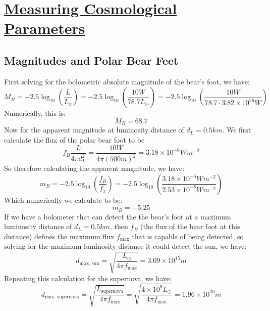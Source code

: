 \section[Measuring Cosmological Parameters]{\hyperlink{toc}{Measuring Cosmological Parameters}}

\subsection{Magnitudes and Polar Bear Feet}
First solving for the bolometric absolute magnitude of the bear's foot, we have:
\begin{equation}
    M_B = -2.5\log_{10}\left(\frac{L}{L_x}\right) = -2.5\log_{10}\left(\frac{10 \si{W}}{78.7 L_{\odot}}\right) = -2.5\log_{10}\left(\frac{10 \si{W}}{78.7 \cdot 3.82 \times 10^{26} \si{W}}\right) 
\end{equation}
Numerically, this is:
\begin{equation}
    \boxed{M_B = 68.7}
\end{equation}
Now for the apparent magnitude at luminosity distance of $d_L = 0.5\si{km}$. We first calculate the flux of the polar bear foot to be
\begin{equation}
    f_B \frac{L}{4\pi d_L^2} = \frac{10\si{W}}{4 \pi(500\si{m})^2} = 3.18 \times 10^{-6} \si{W m^{-2}}
\end{equation}
So therefore calculating the apparent magnitude, we have:
\begin{equation}
    m_B = -2.5\log_{10}\left(\frac{f_B}{f_x}\right) = -2.5\log_{10}\left(\frac{3.18 \times 10^{-6} \si{W m^{-2}}}{2.53 \times 10^{-8} \si{Wm^{-2}} }\right)
\end{equation}
Which numerically we calculate to be:
\begin{equation}
    \boxed{m_B = -5.25}
\end{equation}
If we have a bolometer that can detect the the bear's foot at a maximum luminosity distance of $d_L = 0.5\si{km}$, then $f_B$ (the flux of the bear foot at this distance) defines the maximum flux $f_{\text{max}}$ that is capable of being detected, so solving for the maximum luminosity distance it could detect the sun, we have:
\begin{equation}
    \boxed{d_{\text{max, sun}} = \sqrt{\frac{L_\odot}{4\pi f_{\text{max}}}} = 3.09 \times 10^{15}\si{m}}
\end{equation}
Repeating this calculation for the supernova, we have:
\begin{equation}
    \boxed{d_{\text{max, supernova}} = \sqrt{\frac{L_{\text{supernova}}}{4\pi f_{\text{max}}}} = \sqrt{\frac{4 \times 10^9 L_\odot}{4\pi f_{\text{max}}}} = 1.96 \times 10^{20}\si{m}}
\end{equation}


